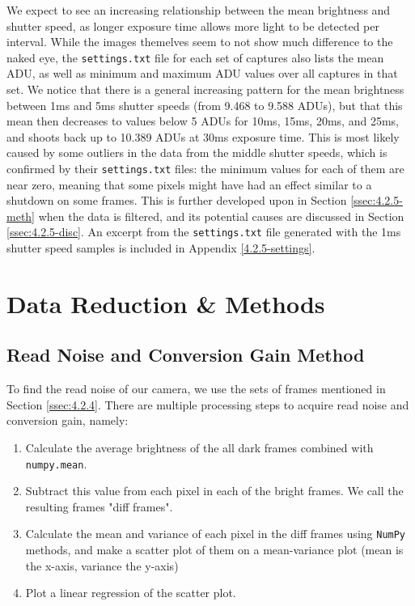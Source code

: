 \documentclass[preprint2]{aastex702}
\begin{document}
			We expect to see an increasing relationship between the mean brightness and shutter speed, as longer exposure time allows more light to be detected per interval. While the images themelves seem to not show much difference to the naked eye, the \texttt{settings.txt} file for each set of captures also lists the mean ADU, as well as minimum and maximum ADU values over all captures in that set. We notice that there is a general increasing pattern for the mean brightness between 1ms and 5ms shutter speeds (from 9.468 to 9.588 ADUs), but that this mean then decreases to values below 5 ADUs for 10ms, 15ms, 20ms, and 25ms, and shoots back up to 10.389 ADUs at 30ms exposure time. This is most likely caused by some outliers in the data from the middle shutter speeds, which is confirmed by their \texttt{settings.txt} files: the minimum values for each of them are near zero, meaning that some pixels might have had an effect similar to a shutdown on some frames. This is further developed upon in Section \ref{ssec:4.2.5-meth} when the data is filtered, and its potential causes are discussed in Section \ref{ssec:4.2.5-disc}. An excerpt from the \texttt{settings.txt} file generated with the 1ms shutter speed samples is included in Appendix \ref{4.2.5-settings}.

    \section{Data Reduction \& Methods}\label{sec:reduc}

		\subsection{Read Noise and Conversion Gain Method}\label{ssec:4.2.4-meth}

			To find the read noise of our camera, we use the sets of frames mentioned in Section \ref{ssec:4.2.4}. There are multiple processing steps to acquire read noise and conversion gain, namely:

			\begin{enumerate}
				\itemsep=0em
				\item Calculate the average brightness of the all dark frames combined with \texttt{numpy.mean}.
				\item Subtract this value from each pixel in each of the bright frames. We call the resulting frames "diff frames". 
				\item Calculate the mean and variance of each pixel in the diff frames using \texttt{NumPy} methods, and make a scatter plot of them on a mean-variance plot (mean is the x-axis, variance the y-axis)
				\item Plot a linear regression of the scatter plot.
			\end{enumerate}
\end{document}
